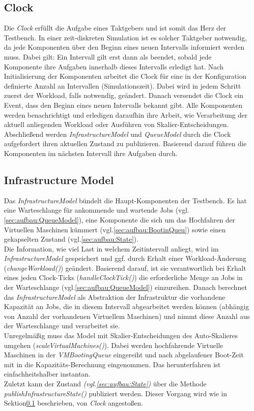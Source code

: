 \subsection{Clock}
\label{sec:aufbau:Clock}
Die \textit{Clock} erfüllt die Aufgabe eines Taktgebers und ist somit das Herz der Testbench. In einer zeit-diskreten Simulation ist es solcher Taktgeber notwendig, da jede Komponenten über den Beginn eines neuen Intervalls informiert werden muss. Dabei gilt: Ein Intervall gilt erst dann als beendet, sobald jede Komponente ihre Aufgaben innerhalb dieses Intervalls erledigt hat. Nach Initialisierung der Komponenten arbeitet die Clock für eine in der Konfiguration definierte Anzahl an Intervallen (Simulationszeit). Dabei wird in jedem Schritt zuerst der Workload, falls notwendig, geändert. Danach versendet die Clock ein Event, dass den Beginn eines neuen Intervalls bekannt gibt. Alle Komponenten werden benachrichtigt und erledigen daraufhin ihre Arbeit, wie Verarbeitung der aktuell anliegenden Workload oder Ausführen von Skalier-Entscheidungen. Abschließend werden \textit{InfrastructureModel} und \textit{QueueModel} durch die Clock aufgefordert ihren aktuellen Zustand zu publizieren. Basierend darauf führen die Komponenten im nächsten Intervall ihre Aufgaben durch. 


\subsection{Infrastructure Model}
Das \textit{InfrastructureModel} bündelt die Haupt-Komponenten der Testbench. Es hat eine Warteschlange für ankommende und wartende Jobs (vgl.\ref{sec:aufbau:QueueModel}), eine Komponente die sich um das Hochfahren der Virtuellen Maschinen kümmert (vgl.\ref{sec:aufbau:BootinQueu}) sowie einen gekapselten Zustand (vgl.\ref{sec:aufbau:State}). \\
Die Information, wie viel Last in welchem Zeitintervall anliegt, wird im \textit{InfrastructureModel} gespeichert und ggf. durch Erhalt einer Workload-Änderung (\textit{changeWorkload()}) geändert. Basierend darauf, ist sie verantwortlich bei Erhalt eines jeden Clock-Ticks (\textit{handleClockTick()}) die erforderliche Menge an Jobs in der Warteschlange (vgl.\ref{sec:aufbau:QueueModel}) einzureihen. Danach berechnet das \textit{InfrastructureModel} als Abstraktion der Infrastruktur die vorhandene Kapazität an Jobs, die in diesem Intervall abgearbeitet werden können (abhängig von Anzahl der vorhandenen Virtuellem Maschinen) und nimmt diese Anzahl aus der Warteschlange und verarbeitet sie. \\
Unregelmäßig muss das Model mit Skalier-Entscheidungen des Auto-Skalieres umgehen (\textit{scaleVirtualMachines()}). Dabei werden hochfahrende Virtuelle Maschinen in der \textit{VMBootingQueue} eingereiht und nach abgelaufener Boot-Zeit mit in die Kapazitäts-Berechnung eingenommen. Das herunterfahren ist einfachheitshalber instantan.\\
Zuletzt kann der Zustand \textit{(vgl.\ref{sec:aufbau:State})} über die Methode \textit{publishInfrastructureState()} publiziert werden. Dieser Vorgang wird wie in Sektion\ref{sec:aufbau:Clock} beschrieben, von \textit{Clock} angestoßen.

